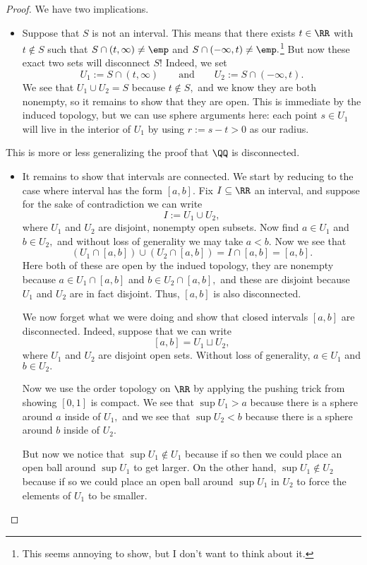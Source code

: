 \documentclass[../notes.tex]{subfiles}
\begin{document}
\begin{proof}
	We have two implications.
	\begin{itemize}
		\item Suppose that $S$ is not an interval. This means that there exists $t\in\RR$ with $t\notin S$ such that $S\cap(t,\infty)\ne\emp$ and $S\cap(-\infty,t)\ne\emp.$\footnote{This seems annoying to show, but I don't want to think about it.} But now these exact two sets will disconnect $S$! Indeed, we set
		\[U_1:=S\cap(t,\infty)\qquad\text{and}\qquad U_2:=S\cap(-\infty,t).\]
		We see that $U_1\cup U_2=S$ because $t\notin S,$ and we know they are both nonempty, so it remains to show that they are open. This is immediate by the induced topology, but we can use sphere arguments here: each point $s\in U_1$ will live in the interior of $U_1$ by using $r:=s-t>0$ as our radius.
	\end{itemize}
	\begin{remark}
		This is more or less generalizing the proof that $\QQ$ is disconnected.
	\end{remark}
	\begin{itemize}
		\item It remains to show that intervals are connected. We start by reducing to the case where interval has the form $[a,b].$ Fix $I\subseteq\RR$ an interval, and suppose for the sake of contradiction we can write
		\[I:=U_1\cup U_2,\]
		where $U_1$ and $U_2$ are disjoint, nonempty open subsets. Now find $a\in U_1$ and $b\in U_2,$ and without loss of generality we may take $a<b.$ Now we see that
		\[(U_1\cap[a,b])\cup(U_2\cap[a,b])=I\cap[a,b]=[a,b].\]
		Here both of these are open by the indued topology, they are nonempty because $a\in U_1\cap[a,b]$ and $b\in U_2\cap[a,b],$ and these are disjoint because $U_1$ and $U_2$ are in fact disjoint. Thus, $[a,b]$ is also disconnected.

		We now forget what we were doing and show that closed intervals $[a,b]$ are disconnected. Indeed, suppose that we can write
		\[[a,b]=U_1\sqcup U_2,\]
		where $U_1$ and $U_2$ are disjoint open sets. Without loss of generality, $a\in U_1$ and $b\in U_2.$

		Now we use the order topology on $\RR$ by applying the pushing trick from showing $[0,1]$ is compact. We see that $\sup U_1>a$ because there is a sphere around $a$ inside of $U_1,$ and we see that $\sup U_2<b$ because there is a sphere around $b$ inside of $U_2.$
		
		But now we notice that $\sup U_1\notin U_1$ because if so then we could place an open ball around $\sup U_1$ to get larger. On the other hand, $\sup U_1\notin U_2$ because if so we could place an open ball around $\sup U_1$ in $U_2$ to force the elements of $U_1$ to be smaller.
		\qedhere
	\end{itemize}
\end{proof}
\end{document}

